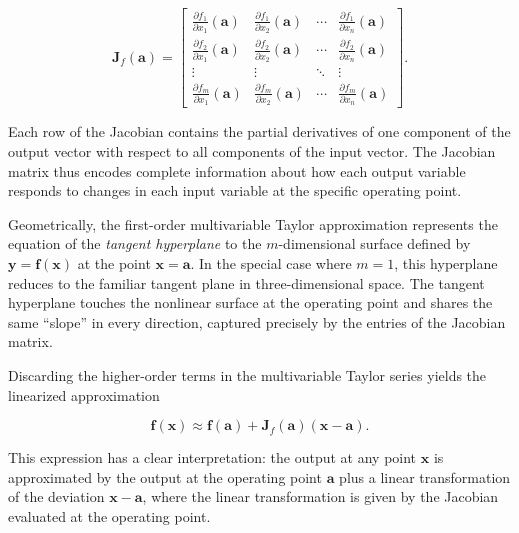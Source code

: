 \[
\mathbf{J}_f(\mathbf{a}) = \begin{bmatrix}
\frac{\partial f_1}{\partial x_1}(\mathbf{a}) & \frac{\partial f_1}{\partial x_2}(\mathbf{a}) & \cdots & \frac{\partial f_1}{\partial x_n}(\mathbf{a}) \\
\frac{\partial f_2}{\partial x_1}(\mathbf{a}) & \frac{\partial f_2}{\partial x_2}(\mathbf{a}) & \cdots & \frac{\partial f_2}{\partial x_n}(\mathbf{a}) \\
\vdots & \vdots & \ddots & \vdots \\
\frac{\partial f_m}{\partial x_1}(\mathbf{a}) & \frac{\partial f_m}{\partial x_2}(\mathbf{a}) & \cdots & \frac{\partial f_m}{\partial x_n}(\mathbf{a})
\end{bmatrix}.
\]

Each row of the Jacobian contains the partial derivatives of one component of the output vector with respect to all components of the input vector. The Jacobian matrix thus encodes complete information about how each output variable responds to changes in each input variable at the specific operating point.

Geometrically, the first-order multivariable Taylor approximation represents the equation of the \emph{tangent hyperplane} to the $m$-dimensional surface defined by $\mathbf{y} = \mathbf{f}(\mathbf{x})$ at the point $\mathbf{x} = \mathbf{a}$. In the special case where $m = 1$, this hyperplane reduces to the familiar tangent plane in three-dimensional space. The tangent hyperplane touches the nonlinear surface at the operating point and shares the same ``slope'' in every direction, captured precisely by the entries of the Jacobian matrix.

Discarding the higher-order terms in the multivariable Taylor series yields the linearized approximation

\[
\mathbf{f}(\mathbf{x}) \approx \mathbf{f}(\mathbf{a}) + \mathbf{J}_f(\mathbf{a})(\mathbf{x}-\mathbf{a}).
\]

This expression has a clear interpretation: the output at any point $\mathbf{x}$ is approximated by the output at the operating point $\mathbf{a}$ plus a linear transformation of the deviation $\mathbf{x} - \mathbf{a}$, where the linear transformation is given by the Jacobian evaluated at the operating point.

